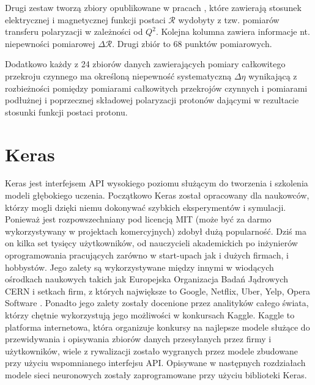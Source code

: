 \documentclass[11pt]{book}
\theoremstyle{definition}
\begin{document}
Drugi zestaw tworzą zbiory opublikowane w pracach \cite{1999PhRvL..82.2221M, 2000PhRvL..84.1398J, 2001PhLB..500...47D, 2001EPJA...12..125P, 2002PhRvL..88i2301G, 2001PhRvC..64c8202G, 2005PhRvC..71e5202P, 2006PhRvC..73f4004H, 2006NuPhA.764..261M, 2006PhRvC..74c5201J, 2007PhRvL..99t2002R, 2007PhRvL..98e2301C}, które zawierają stosunek elektrycznej i magnetycznej funkcji postaci $\mathcal{R}$ wydobyty z tzw. pomiarów transferu polaryzacji w zależności od $Q^2$. Kolejna kolumna zawiera informacje nt. niepewności pomiarowej $\Delta \mathcal{R}$. Drugi zbiór to 68 punktów pomiarowych.  

Dodatkowo każdy z 24 zbiorów danych zawierających pomiary całkowitego przekroju czynnego ma określoną niepewność systematyczną $\Delta \eta$ wynikającą z rozbieżności pomiędzy pomiarami całkowitych przekrojów czynnych i pomiarami podłużnej i poprzecznej składowej polaryzacji protonów dającymi w rezultacie stosunki funkcji postaci protonu. 


\section{Keras}

Keras jest interfejsem API wysokiego poziomu służącym do tworzenia i szkolenia modeli głębokiego uczenia. Początkowo Keras został opracowany dla naukowców, którzy mogli dzięki niemu dokonywać szybkich eksperymentów i symulacji. Ponieważ jest rozpowszechniany pod licencją MIT (może być za darmo wykorzystywany w projektach komercyjnych) zdobył dużą popularność. Dziś ma on kilka set tysięcy użytkowników, od nauczycieli akademickich po inżynierów oprogramowania pracujących zarówno w start-upach jak i dużych firmach, i hobbystów. Jego zalety są wykorzystywane między innymi w wiodących ośrodkach naukowych takich jak Europejska Organizacja Badań Jądrowych CERN i setkach firm, z których największe to Google, Netflix, Uber, Yelp, Opera Software \cite{Chollet:2017}. Ponadto jego zalety zostały docenione przez analityków całego świata, którzy chętnie wykorzystują jego możliwości w konkursach Kaggle. Kaggle to platforma internetowa, która organizuje konkursy na najlepsze modele służące do przewidywania i opisywania zbiorów danych przesyłanych przez firmy i użytkowników, wiele z rywalizacji zostało wygranych przez modele zbudowane przy użyciu wspomnianego interfejsu API. Opisywane w następnych rozdziałach modele sieci neuronowych zostały zaprogramowane przy użyciu biblioteki Keras.
%
\end{document}
